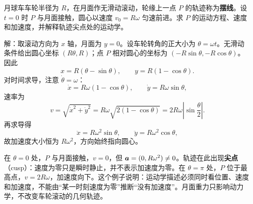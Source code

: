 \begin{example}[月球车车轮上的点：摆线]
月球车车轮半径为 $R$，在月面作无滑动滚动，轮缘上一点 $P$ 的轨迹称为\textbf{摆线}。设 $t=0$ 时 $P$ 与月面接触，圆心以速度 $v_0=R\omega$ 匀速前进。求 $P$ 的运动方程、速度和加速度，并解释轨迹尖点处的运动学。

\begin{center}
\end{center}

解：取滚动方向为 $x$ 轴，月面为 $y=0$。设车轮转角的正大小为 $\theta=\omega t$。无滑动条件给出圆心坐标 $(R\theta,R)$；点 $P$ 相对圆心的坐标为 $(-R\sin\theta,-R\cos\theta)$。因此
\[
x=R(\theta-\sin\theta),\qquad y=R(1-\cos\theta).
\]
对时间求导，注意 $\dot\theta=\omega$：
\[
\dot x=R\omega(1-\cos\theta),\qquad
\dot y=R\omega\sin\theta,
\]
速率为
\[
v=\sqrt{\dot x^2+\dot y^2}
=R\omega\sqrt{2(1-\cos\theta)}
=2R\omega\left|\sin\frac{\theta}{2}\right|.
\]
再求导得
\[
\ddot x=R\omega^2\sin\theta,\qquad
\ddot y=R\omega^2\cos\theta,
\]
故加速度大小恒为 $R\omega^2$，方向始终指向圆心。

在 $\theta=0$ 处，$P$ 与月面接触，$v=0$，但 $\boldsymbol{a}=(0,R\omega^2)\neq0$。轨迹在此出现\textbf{尖点}（cusp）：速度为零只是瞬时静止，并不表示加速度为零。在 $\theta=\pi$ 处，$P$ 位于最高点，$v=2R\omega$，加速度向下。这个例子说明：运动学描述必须同时看位置、速度和加速度，不能由“某一时刻速度为零”推断“没有加速度”。月面重力只影响动力学，不改变车轮滚动的几何轨迹。
\end{example}

